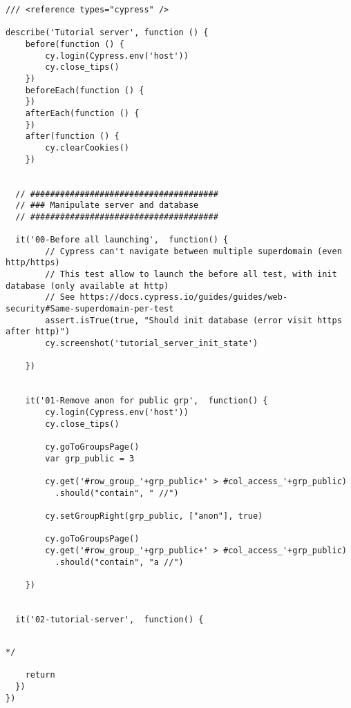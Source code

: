 
\begin{verbatim}
/// <reference types="cypress" />

describe('Tutorial server', function () {
    before(function () {
        cy.login(Cypress.env('host'))
        cy.close_tips()
    })
    beforeEach(function () {
    })
    afterEach(function () {
    })
    after(function () {
        cy.clearCookies()
    })


  // ######################################
  // ### Manipulate server and database
  // ######################################

  it('00-Before all launching',  function() {
        // Cypress can't navigate between multiple superdomain (even http/https)
        // This test allow to launch the before all test, with init database (only available at http)
        // See https://docs.cypress.io/guides/guides/web-security#Same-superdomain-per-test
        assert.isTrue(true, "Should init database (error visit https after http)")
        cy.screenshot('tutorial_server_init_state')

    })


    it('01-Remove anon for public grp',  function() {
        cy.login(Cypress.env('host'))
        cy.close_tips()

        cy.goToGroupsPage()
        var grp_public = 3

        cy.get('#row_group_'+grp_public+' > #col_access_'+grp_public)
          .should("contain", " //")

        cy.setGroupRight(grp_public, ["anon"], true)

        cy.goToGroupsPage()
        cy.get('#row_group_'+grp_public+' > #col_access_'+grp_public)
          .should("contain", "a //")

    })


  it('02-tutorial-server',  function() {


\end{verbatim}



\begin{verbatim}
*/

    return
  })
})

\end{verbatim}
